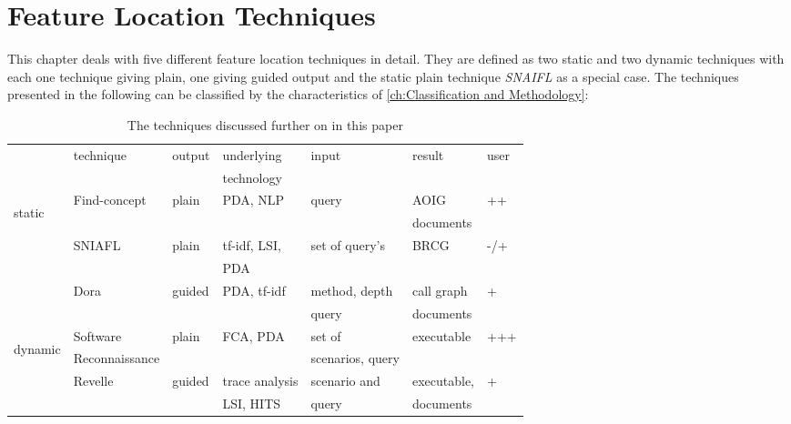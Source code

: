 \chapter{Feature Location Techniques}
\label{ch:feature location techniques}

This chapter deals with five different feature location techniques in detail. They are defined as two static and two dynamic techniques with each one technique giving plain, one giving guided output and the static plain technique \emph{SNAIFL} as a special case. The techniques presented in the following can be classified by the characteristics of \autoref{ch:Classification and Methodology}:

\begin{table}[h]
	\begin{tabular}{|l| l l l l l l|}
		\hline
		 & technique &  output & underlying & input & result & user \\ 
		 &  &  &  technology &  &  &  \\ \hline
		 \multirow{5}{1em}{\begin{sideways} static \end{sideways}}
		 & Find-concept  & plain & PDA, NLP & query & AOIG & ++  \\
		 &      &        &             &         & documents  &   \\
		 & SNIAFL & plain & tf-idf, LSI, & set of query's & BRCG & -/+ \\ 
		 &        &       & PDA  &             &      &
		 \\ 
		 & Dora & guided & PDA, tf-idf & method, depth & call graph & + \\ 
		 &      &        &             & query         & documents  &   \\ \hline
		 \multirow{4}{1em}{\begin{sideways} dynamic \end{sideways}}
		 & Software & plain & FCA, PDA & set of & executable & +++ \\ 
		 & Reconnaissance &  &  & scenarios, query & & \\
		 & Revelle  & guided & trace analysis & scenario and & executable, & +\\
		 &   &  & LSI, HITS & query & documents & \\ \hline
		
	\end{tabular}
	\caption{The techniques discussed further on in this paper}
	\label{table:techniques overview}
\end{table}


